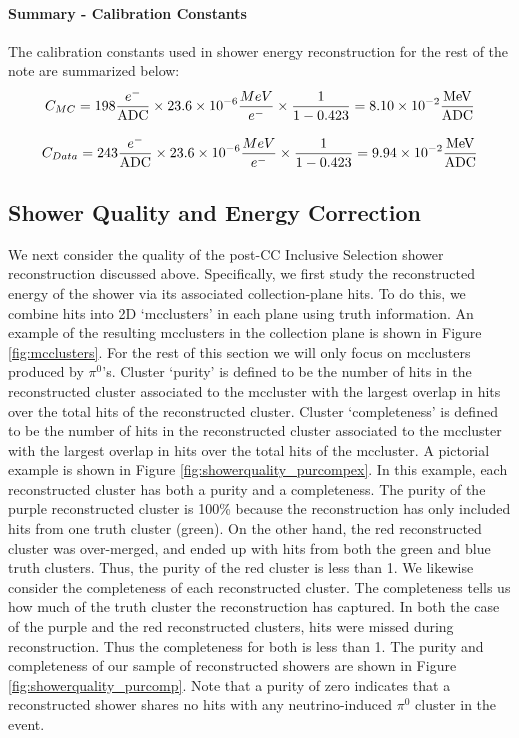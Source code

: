 \paragraph{Summary - Calibration Constants}
The calibration constants used in shower energy reconstruction for the rest of the note are summarized below:
\begin{equation}
  C_{MC} = 198 \frac{e^-}{\rm ADC} \times 23.6 \times 10^{-6} \frac{MeV}{e^-} \times \frac{1}{1-0.423} = 8.10 \times 10^{-2} \frac{\rm MeV}{\rm ADC}
\end{equation}

\begin{equation}
  C_{Data} = 243 \frac{e^-}{\rm ADC} \times 23.6 \times 10^{-6} \frac{MeV}{e^-} \times \frac{1}{1-0.423} = 9.94 \times 10^{-2} \frac{\rm MeV}{\rm ADC}
\end{equation}


\subsection{Shower Quality and Energy Correction}
We next consider the quality of the post-CC Inclusive Selection shower reconstruction discussed above.  Specifically, we first study the reconstructed energy of the shower via its associated collection-plane hits. To do this, we combine hits into 2D `mcclusters' in each plane using truth information.  An example of the resulting mcclusters in the collection plane is shown in Figure \ref{fig:mcclusters}. For the rest of this section we will only focus on mcclusters produced by $\pi^0$'s. Cluster `purity' is defined to be the number of hits in the reconstructed cluster associated to the mccluster with the largest overlap in hits over the total hits of the reconstructed cluster. Cluster `completeness' is defined to be the number of hits in the reconstructed cluster associated to the mccluster with the largest overlap in hits over the total hits of the mccluster. A pictorial example is shown in Figure \ref{fig:showerquality_purcompex}. In this example, each reconstructed cluster has both a purity and a completeness.  The purity of the purple reconstructed cluster is 100\% because the reconstruction has only included hits from one truth cluster (green). On the other hand, the red reconstructed cluster was over-merged, and ended up with hits from both the green and blue truth clusters.  Thus, the purity of the red cluster is less than 1. We likewise consider the completeness of each reconstructed cluster. The completeness tells us how much of the truth cluster the reconstruction has captured.  In both the case of the purple and the red reconstructed clusters, hits were missed during reconstruction. Thus the completeness for both is less than 1.  The purity and completeness of our sample of reconstructed showers are shown in Figure \ref{fig:showerquality_purcomp}. Note that a purity of zero indicates that a reconstructed shower shares no hits with any neutrino-induced $\pi^0$ cluster in the event. 

